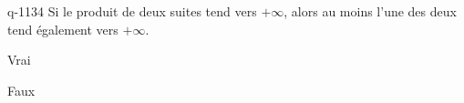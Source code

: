 \begin{truefalse}{q-1134}
Si le produit de deux suites tend vers $+\infty$, alors au moins l'une des deux tend également vers $+\infty$.
\item Vrai
\item* Faux
\end{truefalse}

